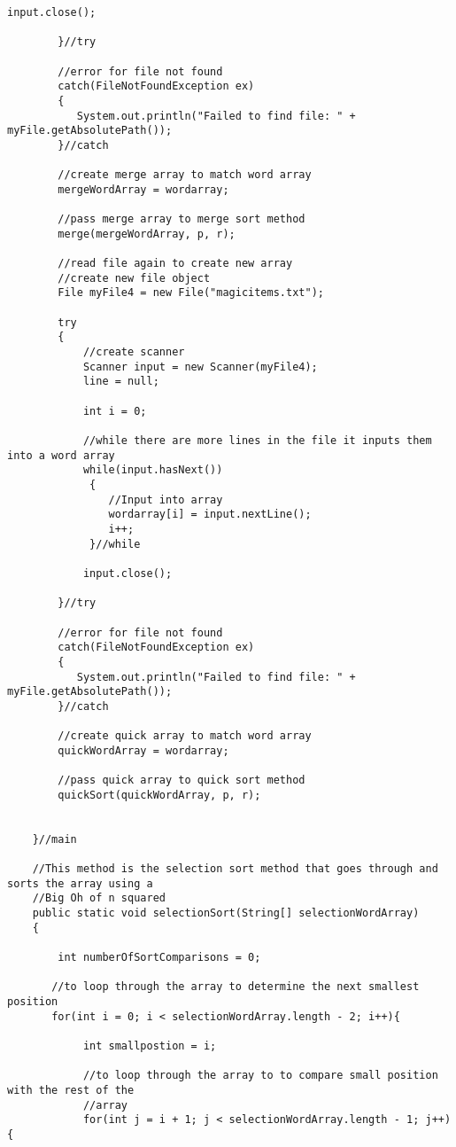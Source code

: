 \documentclass[letterpaper, 10pt,DIV=13]{scrartcl}
\numberwithin{equation}{section} %
\numberwithin{figure}{section} %
\numberwithin{table}{section} %
\begin{document}
\begin{lstlisting}[frame=single, ]
            input.close();  

        }//try

        //error for file not found
        catch(FileNotFoundException ex)
        {
           System.out.println("Failed to find file: " + myFile.getAbsolutePath()); 
        }//catch

        //create merge array to match word array
        mergeWordArray = wordarray;

        //pass merge array to merge sort method
        merge(mergeWordArray, p, r);

        //read file again to create new array
        //create new file object
        File myFile4 = new File("magicitems.txt");
        
        try
        {
            //create scanner
            Scanner input = new Scanner(myFile4);
            line = null;
            
            int i = 0;

            //while there are more lines in the file it inputs them into a word array
            while(input.hasNext())
             {  
                //Input into array 
                wordarray[i] = input.nextLine();        
                i++;
             }//while

            input.close();  

        }//try

        //error for file not found
        catch(FileNotFoundException ex)
        {
           System.out.println("Failed to find file: " + myFile.getAbsolutePath()); 
        }//catch

        //create quick array to match word array
        quickWordArray = wordarray;

        //pass quick array to quick sort method
        quickSort(quickWordArray, p, r);

        
    }//main

    //This method is the selection sort method that goes through and sorts the array using a 
    //Big Oh of n squared
    public static void selectionSort(String[] selectionWordArray)
    {

        int numberOfSortComparisons = 0;

       //to loop through the array to determine the next smallest position
       for(int i = 0; i < selectionWordArray.length - 2; i++){

            int smallpostion = i;
            
            //to loop through the array to to compare small position with the rest of the 
            //array
            for(int j = i + 1; j < selectionWordArray.length - 1; j++){


\end{lstlisting}
\end{document}
